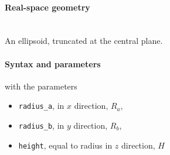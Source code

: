 \paragraph{Real-space geometry}\strut\\
An ellipsoid, truncated at the central plane.

\begin{figure}[h]
\hfill
{}
\hfill
{}
\hfill
{}
\hfill
\end{figure}

\paragraph{Syntax and parameters}
\begin{quote}
\end{quote}
with the parameters
\begin{itemize}
\item \texttt{radius\_a}, in $x$ direction, $R_a$,
\item \texttt{radius\_b}, in $y$ direction, $R_b$,
\item \texttt{height}, equal to radius in $z$ direction, $H$
\end{itemize}


